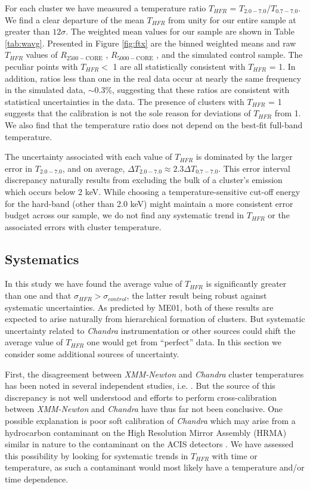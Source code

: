\documentclass{emulateapj}
\newcommand{\rtwf}{$R_{2500-\text{CORE}}$ }
\newcommand{\rfif}{$R_{5000-\text{CORE}}$ }
\begin{document}
For each cluster we have measured a temperature ratio $T_{HFR}$ =
$T_{2.0-7.0}$/$T_{0.7-7.0}$. We find a clear departure of the mean
$T_{HFR}$ from unity for our entire sample at greater than
$12\sigma$. The weighted mean values for our sample are shown in Table
\ref{tab:wavg}. Presented in Figure  \ref{fig:ftx} are the binned
weighted means and raw $T_{HFR}$ values of \rtwf, \rfif, and the
simulated control sample. The peculiar points with $T_{HFR} <$ 1 are
all statistically consistent with $T_{HFR}$ = 1. In addition, ratios
less than one in the real data occur at nearly the same frequency in
the simulated data, $\sim 0.3\%$, suggesting that these ratios are
consistent with statistical uncertainties in the data. The presence of
clusters with $T_{HFR}$ = 1 suggests that the calibration is not the
sole reason for deviations of $T_{HFR}$ from 1. We also find that the
temperature ratio does not depend on the best-fit full-band
temperature.

The uncertainty associated with each value of $T_{HFR}$ is dominated by
the larger error in $T_{2.0-7.0}$, and on average, $\Delta T_{2.0-7.0} \approx
2.3\Delta T_{0.7-7.0}$. This error interval discrepancy naturally results
from excluding the bulk of a cluster's emission which occurs below 2
keV. While choosing a temperature-sensitive cut-off energy for the
hard-band (other than 2.0 keV) might maintain a more consistent
error budget across our sample, we do not find any systematic trend in
$T_{HFR}$ or the associated errors with cluster temperature.

\subsection{Systematics} \label{sec:sys}

In this study we have found the average value of $T_{HFR}$ is significantly
greater than one and that $\sigma_{HFR} > \sigma_{control}$, the
latter result being robust against systematic uncertainties. As
predicted by ME01, both of these results are expected to arise
naturally from hierarchical formation of clusters. But systematic
uncertainty related to {\it Chandra} instrumentation or other sources could
shift the average value of $T_{HFR}$ one would get from ``perfect'' data. In
this section we consider some additional sources of uncertainty.

First, the disagreement between {\it XMM-Newton} and {\it Chandra}
cluster temperatures has been noted in several independent studies,
i.e. \cite{2005ApJ...628..655V,chanxmmdis}. But the source of this
discrepancy is not well understood and efforts to perform
cross-calibration between {\it XMM-Newton} and {\it Chandra} have thus
far not been conclusive. One possible explanation is poor soft
calibration of {\it Chandra} which may arise from a hydrocarbon
contaminant on the High Resolution Mirror Assembly (HRMA) similar in
nature to the contaminant on the ACIS detectors
\citep{aciscontaminant}. We have assessed this possibility by looking
for systematic trends in $T_{HFR}$ with time or temperature, as such a
contaminant would most likely have a temperature and/or time
dependence.
\end{document}
